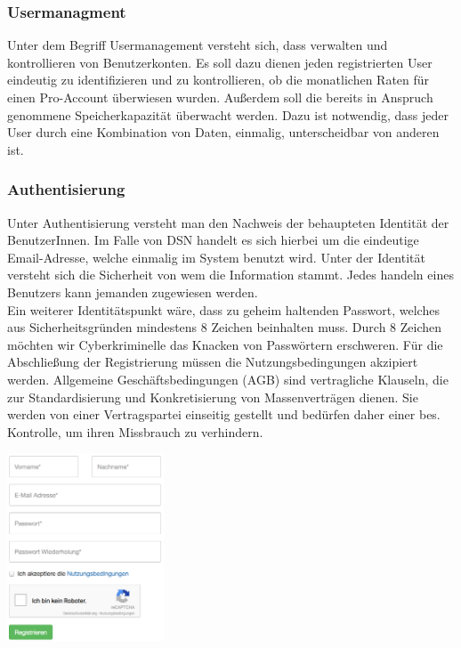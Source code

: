 
\subsubsection{Usermanagment}
Unter dem Begriff Usermanagement versteht sich, dass verwalten und kontrollieren von Benutzerkonten. Es soll dazu dienen jeden registrierten User eindeutig zu identifizieren und zu kontrollieren, ob die monatlichen Raten für einen Pro-Account überwiesen wurden. Außerdem soll die bereits in Anspruch genommene Speicherkapazität überwacht werden. Dazu ist notwendig, dass jeder User durch eine Kombination von Daten, einmalig, unterscheidbar von anderen ist.
\subsubsection{Authentisierung}
Unter Authentisierung versteht man den Nachweis der behaupteten Identität der BenutzerInnen. Im Falle von DSN handelt es sich hierbei um die eindeutige Email-Adresse, welche einmalig im System benutzt wird. Unter der Identität versteht sich die Sicherheit von wem die Information stammt. Jedes handeln eines Benutzers kann jemanden zugewiesen werden.\\
Ein weiterer Identitätspunkt wäre, dass zu geheim haltenden Passwort, welches aus Sicherheitsgründen mindestens 8 Zeichen beinhalten muss. Durch 8 Zeichen möchten wir Cyberkriminelle das Knacken von Passwörtern erschweren. Für die Abschließung der Registrierung müssen die Nutzungsbedingungen akzipiert werden. \grqq{} Allgemeine Geschäftsbedingungen (AGB) sind vertragliche Klauseln, die zur Standardisierung und Konkretisierung von Massenverträgen dienen. Sie werden von einer Vertragspartei einseitig gestellt und bedürfen daher einer bes. Kontrolle, um ihren Missbrauch zu verhindern.\grqq{}\cite{AGB}\\
\cite{VERTEILTE_SYSTEME}\cite{PASSWORT_SCHUTZ}

\includegraphics[width=0.35\textwidth]{images/usermanagement/Registrierung}\\

